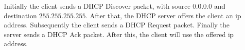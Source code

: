 Initially the client sends a DHCP Discover packet, with source $0.0.0.0$ and destination $255.255.255.255$. After that, the DHCP server offers the client an ip address. Subsequently the client sends a DHCP Request packet. Finally the server sends a DHCP Ack packet. After this, the client will use the offered ip address.
